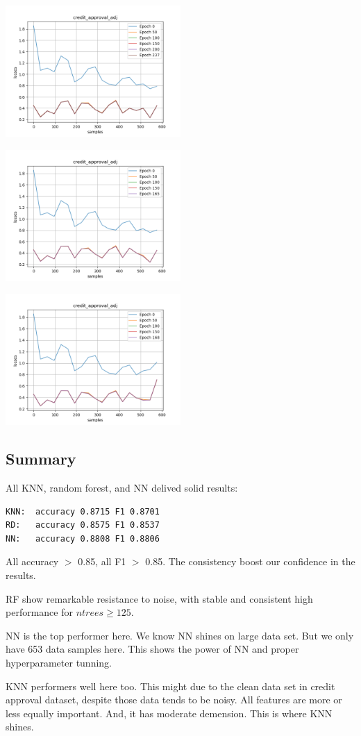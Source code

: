 \includegraphics[width=0.5\textwidth]{./figures/proj_credit_approval_adj_8.png}

\includegraphics[width=0.5\textwidth]{./figures/proj_credit_approval_adj_9.png}

\includegraphics[width=0.5\textwidth]{./figures/proj_credit_approval_adj_10.png}

\subsection{Summary}

All KNN, random forest, and NN delived solid results:    

\begin{verbatim}
KNN:  accuracy 0.8715 F1 0.8701
RD:   accuracy 0.8575 F1 0.8537
NN:   accuracy 0.8808 F1 0.8806
\end{verbatim}

All accuracy $>$ 0.85, all F1 $>$ 0.85. The consistency boost our confidence in the results.  

RF show remarkable resistance to noise, with stable and consistent high performance for $ntrees \ge 125$.  

NN is the top performer here. We know NN shines on large data set. But we only have 653 data samples here. This shows the power of NN and proper hyperparameter tunning.

KNN performers well here too.
This might due to the clean data set in credit approval dataset, despite those data tends to be noisy.
All features are more or less equally important.
And, it has moderate demension.
This is where KNN shines.


